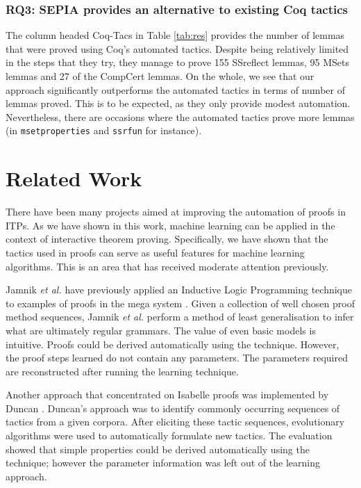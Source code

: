 \documentclass{llncs}
\begin{document}
\vspace{-3mm}

\subsubsection{RQ3: SEPIA provides an alternative to existing Coq tactics}
The column headed Coq-Tacs in Table \ref{tab:res} provides the number of lemmas that were proved using Coq's automated tactics. Despite being relatively limited in the steps that they try, they manage to prove 155 SSreflect lemmas, 95 MSets lemmas and 27 of the CompCert lemmas. On the whole, we see that our approach significantly outperforms the automated tactics in terms of number of lemmas proved. This is to be expected, as they only provide modest automation. Nevertheless, there are occasions where the automated tactics prove more lemmas (in \texttt{msetproperties} and \texttt{ssrfun} for instance). 

\section{Related Work}
\label{sec:related}
There have been many projects aimed at improving the automation of proofs in ITPs. As we have shown in this work, machine learning can be applied in the context of interactive theorem proving. Specifically, we have shown that the tactics used in proofs can serve as useful features for machine learning algorithms. This is an area that has received moderate attention previously.

Jamnik \emph{et al.} have previously applied an Inductive Logic Programming technique to examples of proofs in the mega system \cite{Jamnik03}. Given a collection of well chosen proof method sequences, Jamnik \emph{et al.} perform a method of least generalisation to infer what are ultimately regular grammars. The value of even basic models is intuitive. Proofs could be derived automatically using the technique. However, the proof steps learned do not contain any parameters. The parameters required are reconstructed after running the learning technique.

Another approach that concentrated on Isabelle proofs was implemented by Duncan \cite{Duncan07}. Duncan's approach was to identify commonly occurring sequences of tactics from a given corpora. After eliciting these tactic sequences, evolutionary algorithms were used to automatically formulate new tactics. The evaluation showed that simple properties could be derived automatically using the technique; however the parameter information was left out of the learning approach. 
\end{document}
